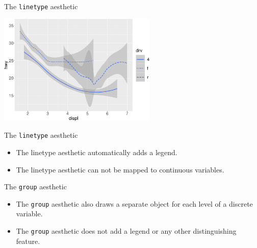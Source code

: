 \documentclass[ignorenonframetext,]{beamer}
\providecommand{\tightlist}{%
  \setlength{\itemsep}{0pt}\setlength{\parskip}{0pt}}
\begin{document}
\begin{frame}{The \texttt{linetype} aesthetic}
\protect\hypertarget{the-linetype-aesthetic-1}{}

\begin{center}\includegraphics[height=200px]{data-visualization_files/figure-beamer/unnamed-chunk-29-1} \end{center}

\end{frame}

\begin{frame}{The \texttt{linetype} aesthetic}
\protect\hypertarget{the-linetype-aesthetic-2}{}

\begin{itemize}
\tightlist
\item
  The linetype aesthetic automatically adds a legend.
\item
  The linetype aesthetic can not be mapped to continuous variables.
\end{itemize}

\end{frame}

\begin{frame}[fragile]{The \texttt{group} aesthetic}
\protect\hypertarget{the-group-aesthetic}{}

\begin{itemize}
\item
  The \texttt{group} aesthetic also draws a separate object for each
  level of a discrete variable.
\item
  The \texttt{group} aesthetic does not add a legend or any other
  distinguishing feature.
\end{itemize}

\end{frame}
\end{document}
